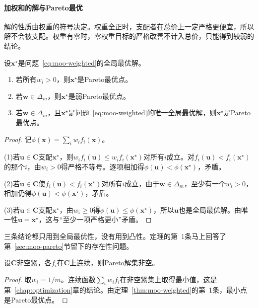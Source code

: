 \paragraph{加权和的解与Pareto最优}
解的性质由权重的符号决定。权重全正时，支配者在总价上一定严格更便宜，所以解不会被支配。权重有零时，零权重目标的严格改善不计入总价，只能得到较弱的结论。

\begin{theorem}[加权和的解]
\label{thm:moo-weighted}
设$\bm{x}^\star$是问题~\eqref{eq:moo-weighted}的全局最优解。
\begin{enumerate}
 \item 若所有$w_i>0$，则$\bm{x}^\star$是Pareto最优点。
 \item 若$\bm{w}\in\Delta_m$，则$\bm{x}^\star$是弱Pareto最优点。
 \item 若$\bm{w}\in\Delta_m$，且$\bm{x}^\star$是问题~\eqref{eq:moo-weighted}的唯一全局最优解，则$\bm{x}^\star$是Pareto最优点。
\end{enumerate}
\end{theorem}

\begin{proof}
记$\phi(\bm{x})=\sum_iw_if_i(\bm{x})$。

(1)若$\bm{u}\in\bm{C}$支配$\bm{x}^\star$，则$w_if_i(\bm{u})\leq w_if_i(\bm{x}^\star)$对所有$i$成立。对$f_i(\bm{u})<f_i(\bm{x}^\star)$的那个$i$，由$w_i>0$得严格不等号。逐项相加得$\phi(\bm{u})<\phi(\bm{x}^\star)$，矛盾。

(2)若$\bm{u}\in\bm{C}$使$f_i(\bm{u})<f_i(\bm{x}^\star)$对所有$i$成立，由于$\bm{w}\in\Delta_m$，至少有一个$w_i>0$，相加仍得$\phi(\bm{u})<\phi(\bm{x}^\star)$，矛盾。

(3)若$\bm{u}\in\bm{C}$支配$\bm{x}^\star$，由$w_i\geq0$得$\phi(\bm{u})\leq\phi(\bm{x}^\star)$，所以$\bm{u}$也是全局最优解。由唯一性$\bm{u}=\bm{x}^\star$，这与“至少一项严格更小”矛盾。
\end{proof}

三条结论都只用到全局最优性，没有用到凸性。定理的第~1条马上回答了第~\ref{sec:moo-pareto}节留下的存在性问题。

\begin{theorem}[Pareto最优点的存在]
\label{thm:moo-existence}
设$\bm{C}$非空紧，各$f_i$在$\bm{C}$上连续，则Pareto解集非空。
\end{theorem}

\begin{proof}
取$w_i=1/m$。连续函数$\sum_iw_if_i$在非空紧集上取得最小值，这是第~\ref{chap:optimization}章的结论。由定理~\ref{thm:moo-weighted}的第~1条，最小点是Pareto最优点。
\end{proof}

